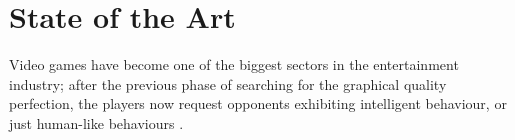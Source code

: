\documentclass{llncs}
\begin{document}



%
\section{State of the Art}
\label{sec:stateofart}
%

Video games have become one of the biggest sectors in the
entertainment industry; after the previous phase of searching for the
graphical quality perfection, the players now request opponents
exhibiting intelligent behaviour, or just human-like behaviours
\cite{artifical-stupidity-game-wisdom2-2004}. %

\end{document}
